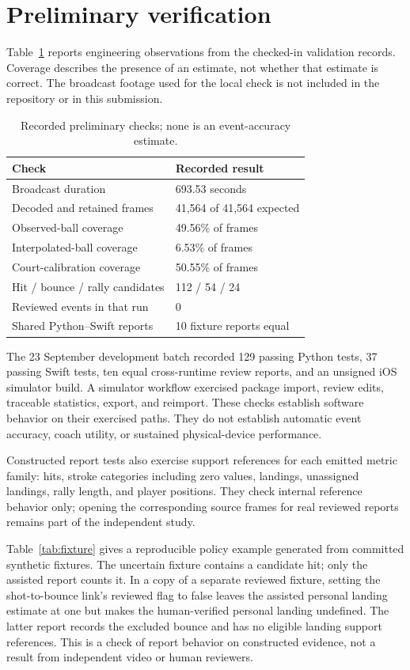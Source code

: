 \documentclass[10pt]{article}
\begin{document}
\section{Preliminary verification}
Table~\ref{tab:checks} reports engineering observations from the checked-in validation records. Coverage describes the presence of an estimate, not whether that estimate is correct. The broadcast footage used for the local check is not included in the repository or in this submission.

\begin{table}[h]
\centering
\caption{Recorded preliminary checks; none is an event-accuracy estimate.}
\label{tab:checks}
\begin{tabular}{ll}
\toprule
Check & Recorded result \\
\midrule
Broadcast duration & 693.53 seconds \\
Decoded and retained frames & 41,564 of 41,564 expected \\
Observed-ball coverage & 49.56\% of frames \\
Interpolated-ball coverage & 6.53\% of frames \\
Court-calibration coverage & 50.55\% of frames \\
Hit / bounce / rally candidates & 112 / 54 / 24 \\
Reviewed events in that run & 0 \\
Shared Python--Swift reports & 10 fixture reports equal \\
\bottomrule
\end{tabular}
\end{table}

The 23 September development batch recorded 129 passing Python tests, 37 passing Swift tests, ten equal cross-runtime review reports, and an unsigned iOS simulator build. A simulator workflow exercised package import, review edits, traceable statistics, export, and reimport. These checks establish software behavior on their exercised paths. They do not establish automatic event accuracy, coach utility, or sustained physical-device performance.

Constructed report tests also exercise support references for each emitted metric family: hits, stroke categories including zero values, landings, unassigned landings, rally length, and player positions. They check internal reference behavior only; opening the corresponding source frames for real reviewed reports remains part of the independent study.

Table~\ref{tab:fixture} gives a reproducible policy example generated from committed synthetic fixtures. The uncertain fixture contains a candidate hit; only the assisted report counts it. In a copy of a separate reviewed fixture, setting the shot-to-bounce link's reviewed flag to false leaves the assisted personal landing estimate at one but makes the human-verified personal landing undefined. The latter report records the excluded bounce and has no eligible landing support references. This is a check of report behavior on constructed evidence, not a result from independent video or human reviewers.
\end{document}
